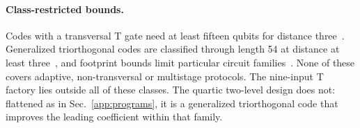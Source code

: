 \documentclass[aps,prl,reprint,twocolumn,amsmath,amssymb,floatfix,nofootinbib,superscriptaddress]{revtex4-2}
\begin{document}
\paragraph*{Class-restricted bounds.}
Codes with a transversal T gate need at least fifteen qubits for distance three~\cite{kbk}. Generalized triorthogonal codes are classified through length 54 at distance at least three~\cite{nezamihaah,wjs}, and footprint bounds limit particular circuit families~\cite{jacinto}. None of these covers adaptive, non-transversal or multistage protocols. The nine-input T factory lies outside all of these classes. The quartic two-level design does not: flattened as in Sec.~\ref{app:programs}, it is a generalized triorthogonal code that improves the leading coefficient within that family.
\end{document}
